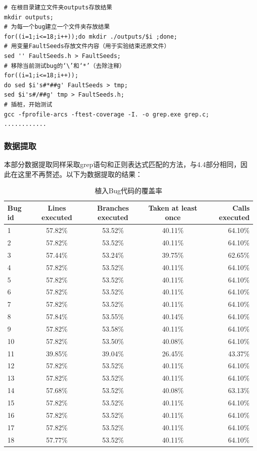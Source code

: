 \documentclass[12pt, a4paper, oneside,bibend=bibtex]{ctexart}
\begin{document}
\begin{lstlisting}[caption={}]
# 在根目录建立文件夹outputs存放结果
mkdir outputs;
# 为每一个bug建立一个文件夹存放结果
for((i=1;i<=18;i++));do mkdir ./outputs/$i ;done;
# 用变量FaultSeeds存放文件内容（用于实验结束还原文件）
sed '' FaultSeeds.h > FaultSeeds;
# 移除当前测试bug的‘\’和‘*’（去除注释）
for((i=1;i<=18;i++)); 
do sed $i's#*##g' FaultSeeds > tmp;
sed $i's#/##g' tmp > FaultSeeds.h;
# 插桩，开始测试
gcc -fprofile-arcs -ftest-coverage -I. -o grep.exe grep.c;
............
\end{lstlisting}


\subsubsection{数据提取}
本部分数据提取同样采取grep语句和正则表达式匹配的方法，与4.4部分相同，因此在这里不再赘述。以下为数据提取的结果：

\begin{table}[htbp]
    \centering
    \caption{植入Bug代码的覆盖率} \label{测试表格}
    \begin{tabular}{lcccr}
        \toprule[2pt]
        \textbf{Bug id} & \textbf{Lines executed} & \textbf{Branches executed}  &\textbf{Taken at least once} &\textbf{Calls executed} \\
        \midrule[1pt]
            1 & 57.82\% & 53.52\% & 40.11\% & 64.10\% \\
            2 & 57.82\% & 53.52\% & 40.11\% & 64.10\%\\
            3 & 57.44\% & 53.24\% & 39.75\% & 62.65\%\\
            4 & 57.82\% & 53.52\% & 40.11\% & 64.10\%\\
            5 & 57.82\% & 53.52\% & 40.11\% & 64.10\%\\
            6 & 57.82\% & 53.52\% & 40.11\% & 64.10\%\\
            7 & 57.82\% & 53.52\% & 40.11\% & 64.10\%\\
            8 & 57.84\% & 53.55\% & 40.14\% & 64.10\%\\
            9 & 57.82\% & 53.58\% & 40.11\% & 64.10\%\\
            10 & 57.82\% & 53.50\% & 40.08\% & 64.10\%\\
            11 & 39.85\% & 39.04\% & 26.45\% & 43.37\%\\
            12 & 57.82\% & 53.52\% & 40.11\% & 64.10\%\\
            13 & 57.82\% & 53.52\% & 40.11\% & 64.10\%\\
            14 & 57.68\% & 53.52\% & 40.08\% & 63.13\%\\
            15 & 57.82\% & 53.52\% & 40.11\% & 64.10\%\\
            16 & 57.82\% & 53.52\% & 40.11\% & 64.10\%\\
            17 & 57.82\% & 53.52\% & 40.11\% & 64.10\%\\
            18 & 57.77\% & 53.52\% & 40.11\% & 64.10\%\\
        \bottomrule[2pt]
    \end{tabular}
\end{table}
\end{document}
